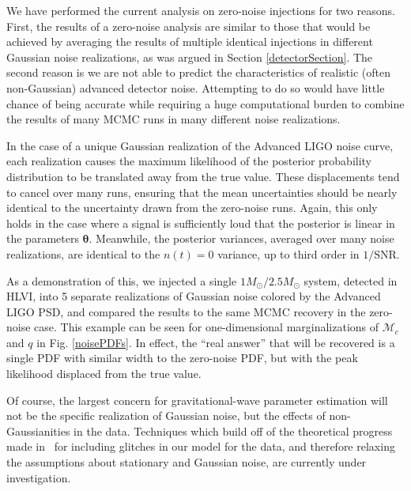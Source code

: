 \documentclass[11pt,a4paper]{emulateapj} 
\newcommand{\thpara}{\boldsymbol{\theta}}
\newcommand{\chmass}{\mathcal{M}_c}
\begin{document}
We have performed the current analysis on zero-noise injections for
two reasons.  First, the results of a zero-noise analysis are
similar to those that would be achieved by averaging the results of
multiple identical injections in different Gaussian noise
realizations, as was argued in Section \ref{detectorSection}.  The second reason 
is we are not able
to predict the characteristics of realistic (often non-Gaussian)
advanced detector noise.  Attempting to do so would have little chance
of being accurate while requiring a huge computational burden to
combine the results of many MCMC runs in many different noise realizations.

In the case of a unique Gaussian realization of the Advanced LIGO
noise curve, each realization causes the maximum likelihood of the
posterior probability distribution to be translated away from the true
value.  These displacements tend to cancel 
    over many runs, ensuring that the mean uncertainties should be nearly identical to 
   the uncertainty drawn from the zero-noise runs.  Again, this only holds in the case
  where a signal is sufficiently loud that the posterior is linear in the parameters 
  $\thpara$.  Meanwhile, the posterior variances, averaged over many noise realizations, 
  are identical to the $n(t) = 0$ variance, up to third order in $1/\text{SNR}$.

As a demonstration of this, we injected a single
$1M_{\odot}/2.5M_{\odot}$ system, detected in HLVI, into 5 separate
realizations of Gaussian noise colored by the Advanced LIGO PSD, and
compared the results to the same MCMC recovery in the zero-noise case.
This example can be seen for one-dimensional marginalizations of
$\chmass$ and $q$ in Fig. \ref{noisePDFs}.  In effect, the ``real
answer'' that will be recovered is a single PDF with similar width to
the zero-noise PDF, but with the peak likelihood displaced from the
true value.

Of course, the largest concern for gravitational-wave parameter
estimation will not be the specific realization of Gaussian noise, but
the effects of non-Gaussianities in the data.  Techniques which build
off of the theoretical progress made
in~\cite{Allen:2002jw,Rover:2011qd,Littenberg:2010gf} for including
glitches in our model for the data, and therefore relaxing the
assumptions about stationary and Gaussian noise, are currently under
investigation.
\end{document}
